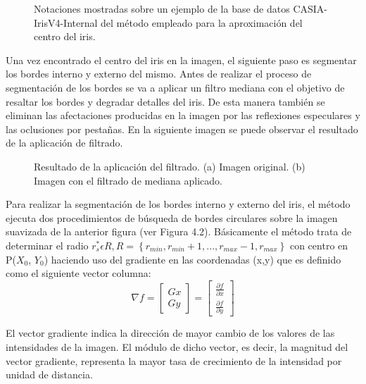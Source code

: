 \begin{figure}[htbp]
\centering
{}
\caption{Notaciones mostradas sobre un ejemplo de la base de datos CASIA-IrisV4-Internal del método empleado para la aproximación del centro del iris.} \label{fig:señales}
\end{figure}

Una vez encontrado el centro del iris en la imagen, el siguiente paso es segmentar los bordes interno y externo del mismo. Antes de realizar el proceso de segmentación de los bordes se va a aplicar un filtro mediana con el objetivo de resaltar los bordes y degradar detalles del iris. De esta manera también se eliminan las afectaciones producidas en la imagen por las reflexiones especulares y las oclusiones por pestañas. En la siguiente imagen se puede observar el resultado de la aplicación de filtrado. \\

\begin{figure}[htbp]
\centering
{}
\caption{Resultado de la aplicación del filtrado. (a) Imagen original. (b) Imagen con el filtrado de mediana aplicado.} \label{fig:señales}
\end{figure}

Para realizar la segmentación de los bordes interno y externo del iris, el método ejecuta dos procedimientos de búsqueda de bordes circulares sobre la imagen suavizada de la anterior figura (ver Figura 4.2). Básicamente el método trata de determinar el radio $r^{*}_{s} \epsilon R, R = \left \{ \left. r_{min}, r_{min}+1,..., r_{max}-1, r_{max} \right \} \right.$ con centro en P($X_{0}$, $Y_{0}$) haciendo uso del gradiente en las coordenadas (x,y) que es definido como el siguiente vector columna:\\

\[
\nabla f = \begin{bmatrix}
Gx\\ 
Gy
\end{bmatrix} = \begin{bmatrix}
\frac{\partial f}{\partial x}\\ 
\frac{\partial f}{\partial y}
\end{bmatrix}
\]

El vector gradiente indica la dirección de mayor cambio de los valores de las intensidades de la imagen. El módulo de dicho vector, es decir, la magnitud del vector gradiente, representa la mayor tasa de crecimiento de la intensidad por unidad de distancia. \\

